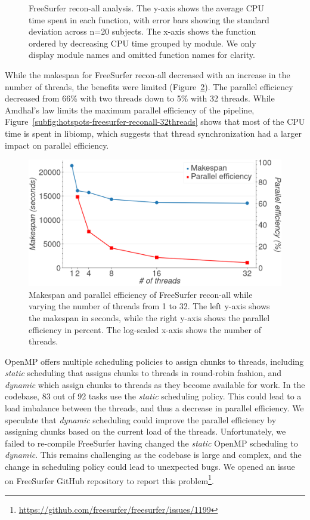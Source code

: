 \documentclass[conference]{IEEEtran}
\begin{document}
\begin{figure}
\begin{subfigure}[t]{0.49\textwidth}
	\end{subfigure}
	\caption{FreeSurfer recon-all analysis. The y-axis shows the average CPU time spent in each function, with error bars showing the standard deviation across n=20 subjects. The x-axis shows the function ordered by decreasing CPU time grouped by module. We only display module names and omitted function names for clarity.}
	\label{fig:hotspots-freesurfer-reconall}
\end{figure}

While the makespan for FreeSurfer recon-all decreased with an increase in the number of threads, the benefits were limited (Figure~\ref{fig:freesurfer-threading}). The parallel efficiency decreased from 66\% with two threads down to 5\% with 32 threads. While Amdhal's law limits the maximum parallel efficiency of the pipeline, Figure~\ref{subfig:hotspots-freesurfer-reconall-32threads} shows that most of the CPU time is spent in libiomp, which suggests that thread synchronization had a larger impact on parallel efficiency.

\begin{figure}
	\includegraphics[width=\linewidth]{figures/makespan-freesurfer.png}
	\caption{Makespan and parallel efficiency of FreeSurfer recon-all while varying the number of threads from 1 to 32. The left y-axis shows the makespan in seconds, while the right y-axis shows the parallel efficiency in percent. The log-scaled x-axis shows the number of threads.}
	\label{fig:freesurfer-threading}
\end{figure}

OpenMP offers multiple scheduling policies to assign chunks to threads, including \textit{static} scheduling that assigns chunks to threads in round-robin fashion, and \textit{dynamic} which assign chunks to threads as they become available for work. In the codebase, 83 out of 92 tasks use the \textit{static} scheduling policy. This could lead to a load imbalance between the threads, and thus a decrease in parallel efficiency. We speculate that \textit{dynamic} scheduling could improve the parallel efficiency by assigning chunks based on the current load of the threads. Unfortunately, we failed to re-compile FreeSurfer having changed the \textit{static} OpenMP scheduling to \textit{dynamic}. This remains challenging as the codebase is large and complex, and the change in scheduling policy could lead to unexpected bugs. We opened an issue on FreeSurfer GitHub repository to report this problem\footnote{\href{https://github.com/freesurfer/freesurfer/issues/1199}{https://github.com/freesurfer/freesurfer/issues/1199}}.
\end{document}
